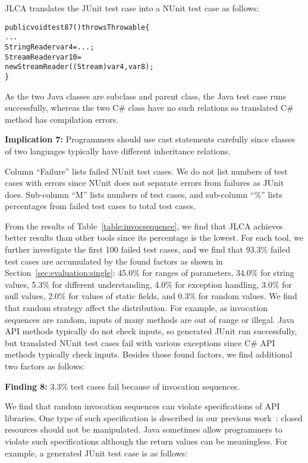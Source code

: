 JLCA translates the JUnit test case into a NUnit test case as follows:

\begin{CodeOut}%
\begin{alltt}
public void test87() throws Throwable\{
  ...
  StringReader var4=...;
  StreamReader var10=
    new StreamReader((Stream)var4, var8);
\}
\end{alltt}
\end{CodeOut}

As the two Java classes are subclass and parent class, the Java test case runs successfully, whereas the two C\# class have no such relations so translated C\# method has compilation errors.

\textbf{Implication 7:} Programmers should use cast statements carefully since classes of two languages typically have different inheritance relations.

Column ``Failure'' lists failed NUnit test cases. We do not list numbers of test cases with errors since NUnit does not separate errors from failures as JUnit does. Sub-column ``M'' lists numbers of test cases, and sub-column ``\%'' lists percentages from failed test cases to total test cases.

From the results of Table~\ref{table:invocsequence}, we find that JLCA achieves better results than other tools since its percentage is the lowest. For each tool, we further investigate the first 100 failed test cases, and we find that 93.3\% failed test cases are accumulated by the found factors as shown in Section~\ref{sec:evaluation:single}: 45.0\% for ranges of parameters, 34.0\% for string values, 5.3\% for different understanding, 4.0\% for exception handling, 3.0\% for null values, 2.0\% for values of static fields, and 0.3\% for random values. We find that random strategy affect the distribution. For example, as invocation sequences are random, inputs of many methods are out of range or illegal. Java API methods typically do not check inputs, so generated JUnit run successfully, but translated NUnit test cases fail with various exceptions since C\# API methods typically check inputs. Besides those found factors, we find additional two factors as follows:

\textbf{Finding 8:} 3.3\% test cases fail because of invocation sequences.

We find that random invocation sequences can violate specifications of API libraries. One type of such specification is described in our previous work~\cite{zhong09:inferring}: closed resources should not be manipulated. Java sometimes allow programmers to violate such specifications although the return values can be meaningless. For example, a generated JUnit test case is as follows:

